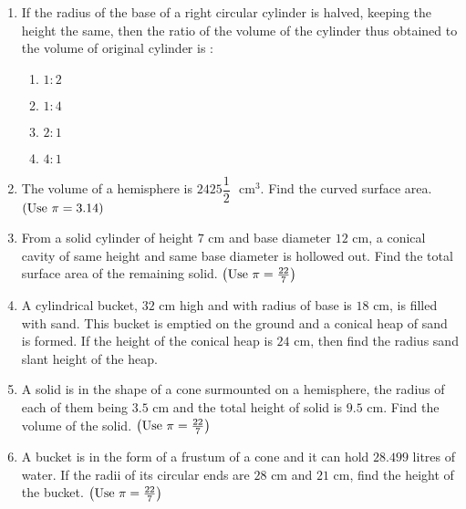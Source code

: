 \begin{enumerate}
\item If the radius of the base of a right circular cylinder is halved, keeping the height the same, then the ratio of the volume of the cylinder thus obtained to the volume of original cylinder is :\\
\begin{enumerate}
\item $1 : 2$\\
\item $1 : 4$\\
\item $2 : 1$\\
\item $4 : 1$\\
\end{enumerate}

\item The volume of a hemisphere is $2425\dfrac{1}{2}$ $\text{ cm}^3$. Find the curved surface area.  $\left(\text{Use } \pi = 3.14\right)$\\

\item From a solid cylinder of height $7\text{ cm}$ and base diameter $12\text{ cm}$, a conical cavity of same height and same base diameter is hollowed out. Find the total surface area of the remaining solid. $\left(\text{Use } \pi = \frac{22}{7}\right)$\\

\item A cylindrical bucket, $32 \text{ cm}$ high and with radius of base is $18 \text{ cm}$, is filled with sand. This bucket is emptied on the ground and a conical heap of sand is formed. If the height of the conical heap is $24 \text{ cm}$, then find the radius sand slant height of the heap.\\


\item A solid is in the shape of a cone surmounted on a hemisphere, the radius of each of them being $3.5\text{ cm}$ and the total height of solid is $9.5\text{ cm}$. Find the volume of the solid. $\left(\text{Use } \pi = \frac{22}{7}\right)$\\

\item A bucket is in the form of a frustum of a cone and it can hold $28.499$ litres of water. If the radii of its circular ends are $28\text{ cm}$ and $21\text{ cm}$, find the height of the bucket. $\left(\text{Use } \pi = \frac{22}{7}\right)$\\



\end{enumerate}
